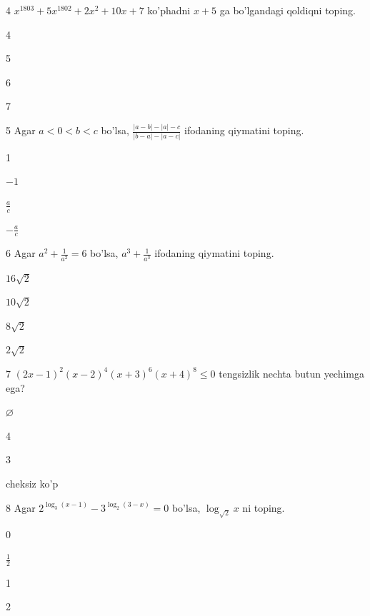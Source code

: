\documentclass[14pt]{article}
\begin{document}
\begin{questionbox}{4}
    \(x^{1803} + 5x^{1802} + 2x^2 + 10x + 7\) ko'phadni \(x + 5\) ga bo'lgandagi qoldiqni toping.
    \begin{options}
        \item 4
        \item 5
        \item 6
        \item 7
    \end{options}
\end{questionbox}

\begin{questionbox}{5}
    Agar \(a < 0 < b < c\) bo'lsa, \(\frac{|a-b| - |a| - c}{|b-a| - |a-c|}\) ifodaning qiymatini toping.
    \begin{options}
        \item 1
        \item \(-1\)
        \item \(\frac{a}{c}\)
        \item \(-\frac{a}{c}\)
    \end{options}
\end{questionbox}

\begin{questionbox}{6}
    Agar \(a^2 + \frac{1}{a^2} = 6\) bo'lsa, \(a^3 + \frac{1}{a^3}\) ifodaning qiymatini toping.
    \begin{options}
        \item \(16\sqrt{2}\)
        \item \(10\sqrt{2}\)
        \item \(8\sqrt{2}\)
        \item \(2\sqrt{2}\)
    \end{options}
\end{questionbox}

\begin{questionbox}{7}
    \((2x-1)^2 (x-2)^4 (x+3)^6 (x+4)^8 \le 0\) tengsizlik nechta butun yechimga ega?
    \begin{options}
        \item \(\varnothing\)
        \item 4
        \item 3
        \item cheksiz ko'p
    \end{options}
\end{questionbox}

\begin{questionbox}{8}
    Agar \(2^{\log_3(x-1)} - 3^{\log_2(3-x)} = 0\) bo'lsa, \(\log_{\sqrt{2}} x\) ni toping.
    \begin{options}
        \item 0
        \item \(\frac{1}{2}\)
        \item 1
        \item 2
    \end{options}
\end{questionbox}
\end{document}

